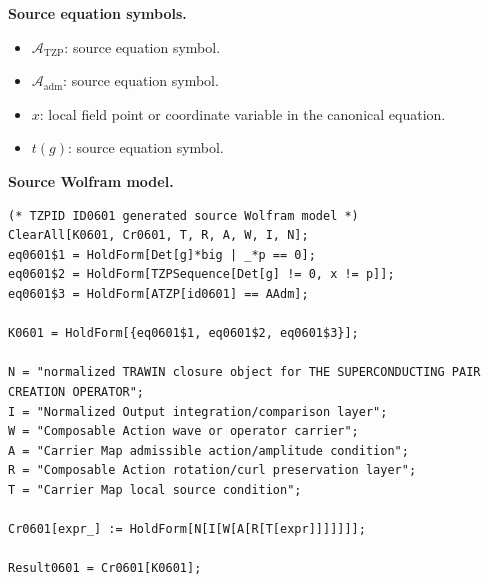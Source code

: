 \begin{minipage}[t]{0.49\linewidth}
\begingroup
\small
\raggedright
\textbf{Source equation symbols.}\par
\begin{itemize}[leftmargin=1.35em,itemsep=1pt,topsep=1pt,parsep=0pt]
    \item $\mathcal{A}_{\mathrm{TZP}}$: source equation symbol.
    \item $\mathcal{A}_{\mathrm{adm}}$: source equation symbol.
    \item $x$: local field point or coordinate variable in the canonical equation.
    \item $t(g)$: source equation symbol.
\end{itemize}
\endgroup
\end{minipage}\hfill
\begin{minipage}[t]{0.47\linewidth}
\begingroup
\scriptsize
\raggedright
\textbf{Source Wolfram model.}\par
\begin{Verbatim}[fontsize=\tiny,breaklines=true,breakanywhere=true]
(* TZPID ID0601 generated source Wolfram model *)
ClearAll[K0601, Cr0601, T, R, A, W, I, N];
eq0601$1 = HoldForm[Det[g]*big | _*p == 0];
eq0601$2 = HoldForm[TZPSequence[Det[g] != 0, x != p]];
eq0601$3 = HoldForm[ATZP[id0601] == AAdm];

K0601 = HoldForm[{eq0601$1, eq0601$2, eq0601$3}];

N = "normalized TRAWIN closure object for THE SUPERCONDUCTING PAIR CREATION OPERATOR";
I = "Normalized Output integration/comparison layer";
W = "Composable Action wave or operator carrier";
A = "Carrier Map admissible action/amplitude condition";
R = "Composable Action rotation/curl preservation layer";
T = "Carrier Map local source condition";

Cr0601[expr_] := HoldForm[N[I[W[A[R[T[expr]]]]]]];

Result0601 = Cr0601[K0601];
\end{Verbatim}
\endgroup
\end{minipage}

